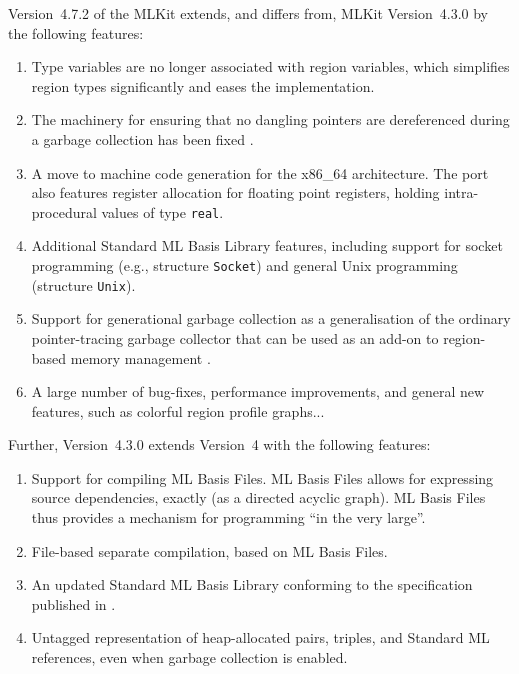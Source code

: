 \documentclass[12pt]{book}
\begin{document}
Version~4.7.2 of the MLKit extends, and differs from, MLKit Version~4.3.0 by the
following features:

\begin{enumerate}
\item Type variables are no longer associated with region variables, which
  simplifies region types significantly and eases the implementation.

\item The machinery for ensuring that no dangling pointers are dereferenced
  during a garbage collection has been fixed \cite{10.1145/3591229}.

\item A move to machine code generation for the x86\_64 architecture. The port
  also features register allocation for floating point registers, holding
  intra-procedural values of type \lstinline{real}.

\item Additional Standard ML Basis Library features, including support for
  socket programming (e.g., structure \lstinline{Socket}) and general Unix
  programming (structure \lstinline{Unix}).

\item Support for generational garbage collection as a generalisation of the
  ordinary pointer-tracing garbage collector that can be used as an add-on to
  region-based memory management
  \cite{10.1007/978-3-030-39197-3_7,ELSMAN_HALLENBERG_2021}.

\item A large number of bug-fixes, performance improvements, and general new
  features, such as colorful region profile graphs...
\end{enumerate}

Further, Version~4.3.0 extends Version~4 with the following features:
\begin{enumerate}
\item Support for compiling
%
%
%
ML Basis Files. ML Basis Files allows for expressing source dependencies,
exactly (as a directed acyclic graph). ML Basis Files thus provides a mechanism
for programming ``in the very large''.

\item File-based
%
%
%
separate compilation, based on ML Basis Files.
\item An updated Standard ML Basis Library conforming to the specification
  published in \cite{basislib2004}.
\item Untagged representation of heap-allocated pairs, triples, and Standard ML
  references, even when garbage collection is enabled.
\end{enumerate}
\end{document}
